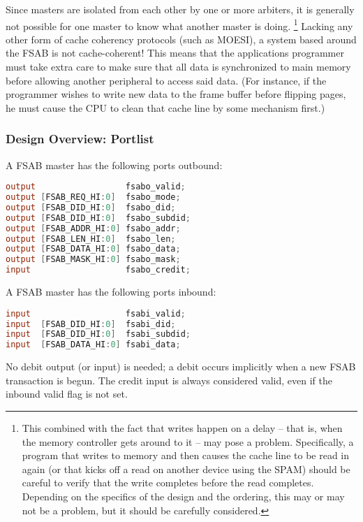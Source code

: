 \documentclass[10pt,twocolumn]{article}
\begin{document}
Since masters are isolated from each other by one or more arbiters, it is
generally not possible for one master to know what another master is doing. 
\footnote{This combined with the fact that writes happen on a delay -- that
is, when the memory controller gets around to it -- may pose a problem. 
Specifically, a program that writes to memory and then causes the cache line
to be read in again (or that kicks off a read on another device using the
SPAM) should be careful to verify that the write completes before the read
completes.  Depending on the specifics of the design and the ordering, this
may or may not be a problem, but it should be carefully considered.} Lacking
any other form of cache coherency protocols (such as MOESI), a system based
around the FSAB is not cache-coherent!  This means that the applications
programmer must take extra care to make sure that all data is synchronized
to main memory before allowing another peripheral to access said data.  (For
instance, if the programmer wishes to write new data to the frame buffer
before flipping pages, he must cause the CPU to clean that cache line by
some mechanism first.)

\subsubsection{Design Overview: Portlist}

A FSAB master has the following ports outbound:

\begin{lstlisting}[basicstyle=\footnotesize,language=Verilog]
output                  fsabo_valid;
output [FSAB_REQ_HI:0]  fsabo_mode;
output [FSAB_DID_HI:0]  fsabo_did;
output [FSAB_DID_HI:0]  fsabo_subdid;
output [FSAB_ADDR_HI:0] fsabo_addr;
output [FSAB_LEN_HI:0]  fsabo_len;
output [FSAB_DATA_HI:0] fsabo_data;
output [FSAB_MASK_HI:0] fsabo_mask;
input                   fsabo_credit;
\end{lstlisting}

A FSAB master has the following ports inbound:

\begin{lstlisting}[basicstyle=\footnotesize,language=Verilog]
input                   fsabi_valid;
input  [FSAB_DID_HI:0]  fsabi_did;
input  [FSAB_DID_HI:0]  fsabi_subdid;
input  [FSAB_DATA_HI:0] fsabi_data;
\end{lstlisting}

No debit output (or input) is needed; a debit occurs implicitly when a new
FSAB transaction is begun. The credit input is always considered valid, even
if the inbound valid flag is not set.
\end{document}

